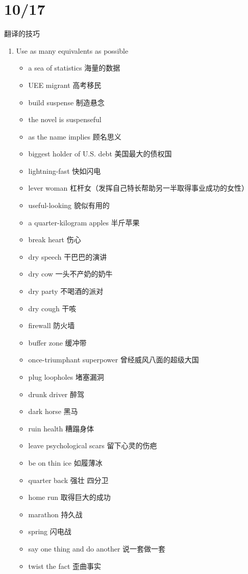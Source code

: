 \documentclass{ctexart}
\begin{document}
\section{10/17}
翻译的技巧 
\begin{enumerate}
  \item Use as many equivalents as possible
\begin{itemize}
  \item a sea of statistics 海量的数据 
  \item UEE migrant 高考移民
  \item build suspense 制造悬念
  \item the novel is suspenseful
  \item as the name implies 顾名思义 
  \item biggest holder of U.S. debt 美国最大的债权国 
  \item lightning-fast 快如闪电 
  \item lever woman 杠杆女（发挥自己特长帮助另一半取得事业成功的女性）
  \item useful-looking 貌似有用的 
  \item a quarter-kilogram apples 半斤苹果
  \item break heart 伤心
  \item dry speech 干巴巴的演讲
  \item dry cow 一头不产奶的奶牛 
  \item dry party 不喝酒的派对 
  \item dry cough 干咳
  \item firewall 防火墙
  \item buffer zone 缓冲带 
  \item once-triumphant superpower 曾经威风八面的超级大国 
  \item plug loopholes 堵塞漏洞 
  \item drunk driver 醉驾 
  \item dark horse 黑马
  \item ruin health 糟蹋身体
  \item leave psychological scars 留下心灵的伤疤
  \item be on thin ice 如履薄冰 
  \item quarter back 强壮 四分卫 
  \item home run 取得巨大的成功
  \item marathon 持久战
  \item spring 闪电战
  \item say one thing and do another 说一套做一套
  \item twist the fact 歪曲事实 

\end{itemize}
\end{enumerate}
\end{document}
